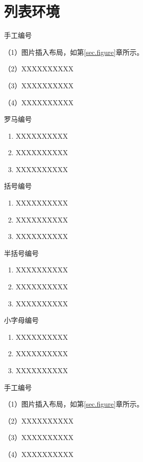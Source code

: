 
\section{列表环境}

手工编号

（1）图片插入布局，如第\ref{sec.figure}章所示。

（2）XXXXXXXXXX

（3）XXXXXXXXXX

（4）XXXXXXXXXX

罗马编号
\begin{enumerate}[label=(\roman*)]
 \item XXXXXXXXXX
 \item XXXXXXXXXX
 \item XXXXXXXXXX
\end{enumerate}

括号编号
\begin{enumerate}[label=(\arabic*)]
 \item XXXXXXXXXX
 \item XXXXXXXXXX
 \item XXXXXXXXXX
\end{enumerate}

半括号编号
\begin{enumerate}[label=(\arabic*)]
 \item XXXXXXXXXX
 \item XXXXXXXXXX
 \item XXXXXXXXXX
\end{enumerate}

小字母编号
\begin{enumerate}[label=(\alph*)]
 \item XXXXXXXXXX
 \item XXXXXXXXXX
 \item XXXXXXXXXX
\end{enumerate}


手工编号

（1）图片插入布局，如第\ref{sec.figure}章所示。

（2）XXXXXXXXXX

（3）XXXXXXXXXX

（4）XXXXXXXXXX